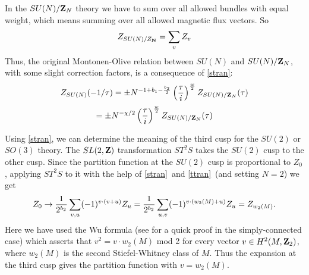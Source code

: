 \documentclass[12pt]{article}
\numberwithin{equation}{section}
\begin{document}
In the $SU(N)/{\bf Z}_N$ theory we have to sum over all
allowed bundles with equal weight, which means summing
over all allowed magnetic flux vectors. So
%
$$Z_{SU(N)/Z_{\bf N}}=\sum_v Z_v$$
%
Thus, the original Montonen-Olive relation between
$SU(N)$ and $SU(N)/{\bf Z}_N$, with some slight
correction factors, is a consequence of \eqref{stran}:
%
$$Z_{SU(N)}({-1/\tau})=\pm N^{-1+b_1-{b_2\over 2}}
\left({\tau\over i}\right)^{w\over 2}Z_{SU(N)/{\bf Z}_N}(\tau )$$
\begin{equation}
  \label{pred}
  =\pm N^{-\chi/2}\left({\tau\over i}\right)^{w\over 2}Z_{SU(N)/{\bf
  Z}_N}(\tau )
\end{equation}
%

\bigskip
{}

Using \eqref{stran}, we can determine the meaning of the third
cusp for the $SU(2)$ or $SO(3)$  theory.
The $SL(2,{\bf Z})$ transformation $ST^2S$
takes the $SU(2)$ cusp to the other cusp.
Since the partition function at the $SU(2)$ cusp
is proportional to $Z_0$, applying $ST^2S$ to it
with the help of \eqref{stran}\ and \eqref{ttran}\ (and setting $N=2$) we get
%
\begin{equation}
  \label{nuddy}
  Z_0\rightarrow {1\over 2^{b_2} }\sum_{v,u}(-1)^{v\cdot (v+u)}Z_u
  ={1\over 2^{b_2}}\sum_{u,v}(-1)^{v\cdot (w_2(M)+u)}Z_u= Z_{w_2(M)}.
\end{equation}
%
Here we have used the Wu formula (see \cite{krd} for a quick proof in
  the simply-connected
case) which asserts that
$v^2=v\cdot w_2(M)$ mod 2 for every vector $v\in H^2(M,{\bf Z}_2)$,
where $w_2(M)$ is the second Stiefel-Whitney class of $M$.
Thus the expansion at the third cusp gives the partition function
with $v=w_2(M)$.

\bigskip
{}
\end{document}
